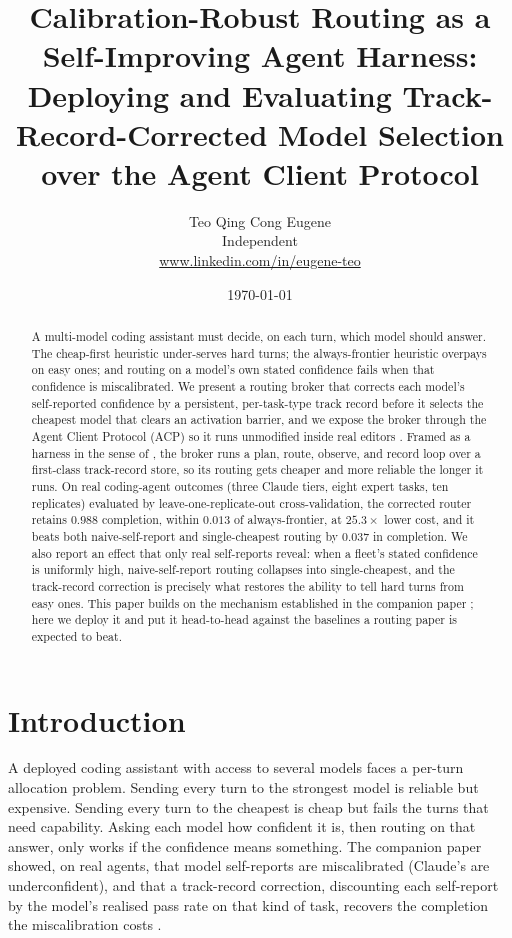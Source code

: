 \documentclass[11pt]{article}
\title{\bfseries Calibration-Robust Routing as a Self-Improving Agent Harness:\\ Deploying and Evaluating Track-Record-Corrected Model Selection over the Agent Client Protocol}
\author{Teo Qing Cong Eugene\\ \small Independent \\ \small \href{https://www.linkedin.com/in/eugene-teo}{www.linkedin.com/in/eugene-teo}}
\date{\today}
\begin{document}
\maketitle

\begin{abstract}
\noindent
A multi-model coding assistant must decide, on each turn, which model should answer. The cheap-first heuristic under-serves hard turns; the always-frontier heuristic overpays on easy ones; and routing on a model's own stated confidence fails when that confidence is miscalibrated. We present a routing broker that corrects each model's self-reported confidence by a persistent, per-task-type track record before it selects the cheapest model that clears an activation barrier, and we expose the broker through the Agent Client Protocol (ACP) so it runs unmodified inside real editors \citep{acp2025}. Framed as a harness in the sense of \citet{weng2026harness}, the broker runs a plan, route, observe, and record loop over a first-class track-record store, so its routing gets cheaper and more reliable the longer it runs. On real coding-agent outcomes (three Claude tiers, eight expert tasks, ten replicates) evaluated by leave-one-replicate-out cross-validation, the corrected router retains $0.988$ completion, within $0.013$ of always-frontier, at $25.3\times$ lower cost, and it beats both naive-self-report and single-cheapest routing by $0.037$ in completion. We also report an effect that only real self-reports reveal: when a fleet's stated confidence is uniformly high, naive-self-report routing collapses into single-cheapest, and the track-record correction is precisely what restores the ability to tell hard turns from easy ones. This paper builds on the mechanism established in the companion paper \citep{teo2026cta}; here we deploy it and put it head-to-head against the baselines a routing paper is expected to beat.
\end{abstract}

\section{Introduction}

A deployed coding assistant with access to several models faces a per-turn allocation problem. Sending every turn to the strongest model is reliable but expensive. Sending every turn to the cheapest is cheap but fails the turns that need capability. Asking each model how confident it is, then routing on that answer, only works if the confidence means something. The companion paper showed, on real agents, that model self-reports are miscalibrated (Claude's are underconfident), and that a track-record correction, discounting each self-report by the model's realised pass rate on that kind of task, recovers the completion the miscalibration costs \citep{teo2026cta}.
\end{document}
